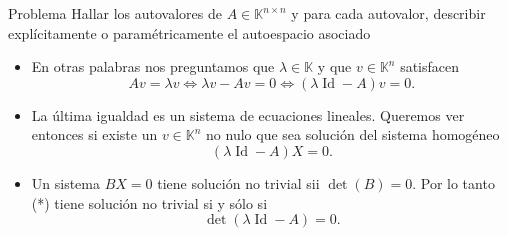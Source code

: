 \documentclass[handout]{beamer} %
\newcommand{\Id}{\operatorname{Id}}
\newcommand{\K}{\mathbb K}
\begin{document}
    \begin{frame}
    
    \begin{exampleblock}{Problema}
    Hallar los autovalores de $A\in\K^{n\times n}$ y para cada autovalor, describir explícitamente o paramétricamente el autoespacio asociado
    \end{exampleblock}\pause
    
    \begin{itemize}
        \item En otras palabras nos preguntamos que $\lambda\in\K$ y  que $v\in\K^{n}$ satisfacen
        $$
        A v=\lambda v
        \Longleftrightarrow
        \lambda v - A v=0
        \Longleftrightarrow
        (\lambda\Id-A)v=0 .
        $$\pause
        \item La última igualdad es un sistema de ecuaciones lineales. Queremos ver entonces si existe un $v\in\K^{n}$ no nulo que sea solución del sistema homogéneo
        \begin{equation*}
            (\lambda\Id-A)X=0.\tag{*}
        \end{equation*}\pause
        \item  Un  sistema $BX =0$ tiene solución no trivial sii $\det(B)=0$. Por lo tanto (*) tiene  solución no trivial si y sólo si 
        $$
        \det(\lambda\Id-A)=0.
        $$ 
    \end{itemize}

    \end{frame}


    
\end{document}
